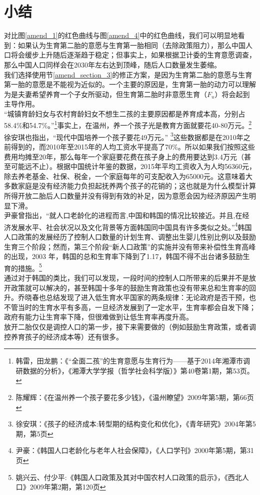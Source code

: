 \documentclass[a4paper]{article}
\begin{document}
\section{小结}
对比图\ref{amend_1}的红色曲线与图\ref{amend_4}中的红色曲线，我们可以明显地看到：如果认为生育第二胎的意愿与生育第一胎相同（去除政策阻力），那么中国人口将会缓步上升随后逐渐趋于稳定；但事实上，如果根据卫计委的生育意愿调查，那么中国人口同样会在2030年左右达到顶峰，随后人口数量发生萎缩。\\
\indent
我们选择使用节\ref{amend_section_3}的修正方案，是因为生育第二胎的意愿与生育第一胎的意愿是不能视为近似的。一个主要的原因是，生育第一胎的动力可以理解为是夫妻希望养育一个子女所驱动，但生育第二胎时非意愿生育（$F_u$）将会起到主导作用。\\
\indent
“城镇育龄妇女与农村育龄妇女不想生二孩的主要原因都是养育成本高，分别占58.4\%和54.7\%。”\footnote{韩雷，田龙鹏：《“全面二孩”的生育意愿与生育行为——基于2014年湘潭市调研数据的分析》，《湘潭大学学报（哲学社会科学版）》第40卷第1期，第53页。}事实上，在温州，养一个孩子光是教育方面就要花40-80万元。\footnote{陈耀辉：《在温州养一个孩子要花多少钱》，《温州瞭望》2009年第5期，第66页}徐安琪也指出，“现代中国培养一个孩子要花49万元。” \footnote{徐安琪：《孩子的经济成本:转型期的结构变化和优化》，《青年研究》2004年第5期，第5页}这些数据都是在2010年之前得到的，而2010年至2015年的人均工资水平提高了70\%。所以如果我们按照这些费用均摊至20年，那么每年一个家庭要花费在孩子身上的费用要达到3.4万元（甚至可能远不止）。根据中国统计年鉴的数据，2015年平均工资收入为人均56360元，除去养老基金、社保、税金，一个家庭每年的可支配收入为65000元。这意味着大多数家庭是没有经济能力负担起抚养两个孩子的花销的；这也就是为什么模型计算所得开放二胎后人口数量并没有得到有效的补足，因为意愿会因为经济原因产生明显下滑。\\
\indent
尹豪曾指出，“就人口老龄化的进程而言,中国和韩国的情况比较接近。并且,在经济发展水平、社会状况以及文化背景等方面韩国同中国具有许多类似之处。”\footnote{尹豪：《韩国人口老龄化与老年人社会保障》，《人口学刊》2000年第5期，第31页}韩国人口政策的发展经历了控制人口数量的计划生育、调整出生婴儿性别比例以及鼓励生育三个阶段；然而，第三个阶段“新人口政策”的实施并没有带来补偿性生育高峰的出现，2003 年，韩国的总和生育率下降到了1.17，韩国不得不出台诸多鼓励生育的措施。\footnote{姚兴云、付少平:《韩国人口政策及其对中国农村人口政策的启示》，《西北人口》2009年第2期，第120页}\\
\indent
通过对于韩国的类比，我们可以发现，一段时间的控制人口所带来的后果并不是放开政策就可以解决的，甚至韩国十多年的鼓励生育政策也没有带来总和生育率的回升。乔晓春也总结发现了进入低生育水平国家的两条规律：无论政府是否干预，也不管当时的生育水平有多高，一旦经济发展到了一定水平，生育率都会自发下降；政府有能力让生育率下降，但很难做到让低生育率再度升高。\\
\indent
放开二胎仅仅是调控人口的第一步，接下来需要做的（例如鼓励生育政策，或者调控养育孩子的经济成本等）还有很多。
	
\end{document}
